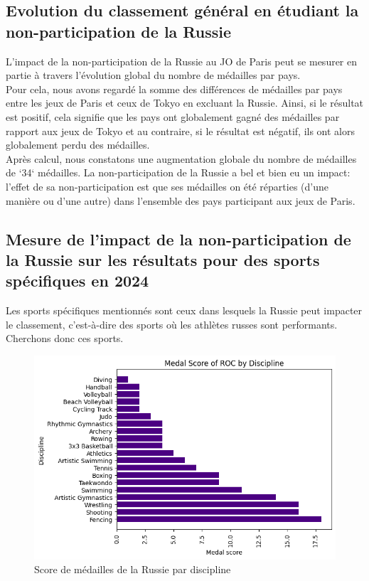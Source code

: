 \documentclass{article}
\begin{document}
\subsection{Evolution du classement général en étudiant la non-participation de la Russie}

L'impact de la non-participation de la Russie au JO de Paris peut se mesurer en partie à travers l'évolution global du nombre de médailles par pays.
\\

Pour cela, nous avons regardé la somme des différences de médailles par pays entre les jeux de Paris et ceux de Tokyo en excluant la Russie. Ainsi, si le résultat est positif, cela signifie que les pays ont globalement gagné des médailles par rapport aux jeux de Tokyo et au contraire, si le résultat est négatif, ils ont alors globalement perdu des médailles.
\\

Après calcul, nous constatons une augmentation globale du nombre de médailles de `34` médailles. La non-participation de la Russie a bel et bien eu un impact: l'effet de sa non-participation est que ses médailles on été réparties (d'une manière ou d'une autre) dans l'ensemble des pays participant aux jeux de Paris.

\subsection{Mesure de l'impact de la non-participation de la Russie sur les résultats pour des sports spécifiques en 2024}
Les sports spécifiques mentionnés sont ceux dans lesquels la Russie peut impacter le classement, c'est-à-dire des sports où les athlètes russes sont performants. Cherchons donc ces sports.

\begin{figure}[H]
    \centering
    \includegraphics[width=0.75\linewidth]{assets/perf_ROC.png}
    \caption{Score de médailles de la Russie par discipline}
    \label{fig:enter-label}
\end{figure}
\end{document}
